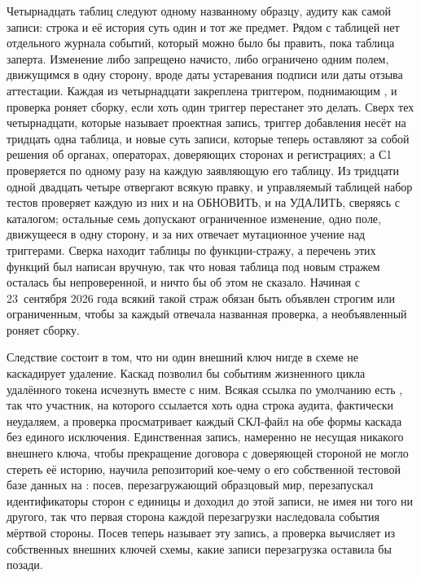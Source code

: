 Четырнадцать таблиц следуют одному названному образцу, аудиту как самой записи: строка и её
история суть один и тот же предмет. Рядом с таблицей нет отдельного журнала событий, который можно
было бы править, пока таблица заперта. Изменение либо запрещено начисто, либо ограничено одним
полем, движущимся в одну сторону, вроде даты устаревания подписи или даты отзыва аттестации.
Каждая из четырнадцати закреплена триггером, поднимающим , и
проверка роняет сборку, если хоть один триггер перестанет это делать. Сверх тех четырнадцати,
которые называет проектная запись, триггер добавления несёт на  тридцать одна
таблица, и новые суть записи, которые теперь оставляют за собой решения об органах, операторах,
доверяющих сторонах и регистрациях; а С1 проверяется по одному разу на
каждую заявляющую его таблицу. Из тридцати одной двадцать четыре отвергают всякую правку, и
управляемый таблицей набор тестов проверяет каждую из них и на ОБНОВИТЬ, и на УДАЛИТЬ, сверяясь с
каталогом; остальные семь допускают ограниченное изменение, одно поле, движущееся в одну сторону,
и за них отвечает мутационное учение над триггерами. Сверка находит таблицы по функции-стражу, а
перечень этих функций был написан вручную, так что новая таблица под новым стражем осталась бы
непроверенной, и ничто бы об этом не сказало. Начиная с 23~сентября 2026 года всякий такой страж
обязан быть объявлен строгим или ограниченным, чтобы за каждый отвечала названная проверка, а
необъявленный роняет сборку. \sImpl

Следствие состоит в том, что ни один внешний ключ нигде в схеме не каскадирует удаление. Каскад
позволил бы событиям жизненного цикла удалённого токена исчезнуть вместе с ним. Всякая ссылка по
умолчанию есть , так что участник, на которого ссылается хоть одна строка аудита,
фактически неудаляем, а проверка просматривает каждый СКЛ-файл на обе формы каскада без единого
исключения. Единственная запись, намеренно не несущая никакого внешнего ключа, чтобы прекращение
договора с доверяющей стороной не могло стереть её историю, научила репозиторий кое-чему о его
собственной тестовой базе данных на : посев, перезагружающий образцовый мир,
перезапускал идентификаторы сторон с единицы и доходил до этой записи, не имея ни того ни другого,
так что первая сторона каждой перезагрузки наследовала события мёртвой стороны. Посев теперь
называет эту запись, а проверка вычисляет из собственных внешних ключей схемы, какие записи
перезагрузка оставила бы позади.

